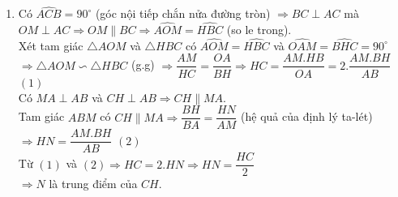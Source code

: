 \begin{ex}
{\begin{enumerate}
\item Có $\widehat{ACB}=90^\circ$ (góc nội tiếp chắn nửa đường tròn) $\Rightarrow BC\perp AC$ mà $OM\perp AC\Rightarrow OM\parallel BC\Rightarrow \widehat{AOM}=\widehat{HBC}$ (so le trong).\\
Xét tam giác $ \triangle AOM$ và $\triangle HBC$ có $\widehat{AOM}=\widehat{HBC}$ và $\widehat{OAM}=\widehat{BHC}=90^\circ$\\ 
$\Rightarrow \triangle AOM\backsim\triangle HBC$ (g.g)
$\Rightarrow \dfrac{AM}{HC}=\dfrac{OA}{BH}\Rightarrow HC=\dfrac{AM.HB}{OA}=2.\dfrac{AM.BH}{AB}$ $(1)$\\
Có $MA\perp AB$ và $CH\perp AB\Rightarrow CH\parallel MA$.\\
Tam giác $ABM$ có $CH\parallel MA\Rightarrow \dfrac{BH}{BA}=\dfrac{HN}{AM}$ (hệ quả của định lý ta-lét)\\ $\Rightarrow HN=\dfrac{AM.BH}{AB}$ $(2)$\\
Từ $(1)$ và $(2)\Rightarrow HC=2.HN\Rightarrow HN=\dfrac{HC}{2}$\\
$\Rightarrow N$ là trung điểm của $CH$.
\end{enumerate}
}
\end{ex}

